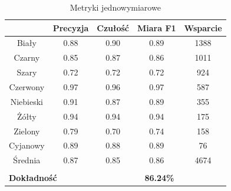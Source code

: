 \begin{table}[h!]
\begin{center}
\begin{tabular}{ccccc}
\cline{2-5}
\multicolumn{1}{c|}{}           & \multicolumn{1}{c|}{Precyzja} & \multicolumn{1}{c|}{Czułość} & \multicolumn{1}{c|}{Miara F1} & \multicolumn{1}{c|}{Wsparcie} \\ \hline
\multicolumn{1}{|c|}{Biały}     & \multicolumn{1}{c|}{0.88}     & \multicolumn{1}{c|}{0.90}    & \multicolumn{1}{c|}{0.89}     & \multicolumn{1}{c|}{1388}     \\ \hline
\multicolumn{1}{|c|}{Czarny}    & \multicolumn{1}{c|}{0.85}     & \multicolumn{1}{c|}{0.87}    & \multicolumn{1}{c|}{0.86}     & \multicolumn{1}{c|}{1011}     \\ \hline
\multicolumn{1}{|c|}{Szary}     & \multicolumn{1}{c|}{0.72}     & \multicolumn{1}{c|}{0.72}    & \multicolumn{1}{c|}{0.72}     & \multicolumn{1}{c|}{924}      \\ \hline
\multicolumn{1}{|c|}{Czerwony}  & \multicolumn{1}{c|}{0.97}     & \multicolumn{1}{c|}{0.96}    & \multicolumn{1}{c|}{0.97}     & \multicolumn{1}{c|}{587}      \\ \hline
\multicolumn{1}{|c|}{Niebieski} & \multicolumn{1}{c|}{0.91}     & \multicolumn{1}{c|}{0.87}    & \multicolumn{1}{c|}{0.89}     & \multicolumn{1}{c|}{355}      \\ \hline
\multicolumn{1}{|c|}{Żółty}     & \multicolumn{1}{c|}{0.94}     & \multicolumn{1}{c|}{0.94}    & \multicolumn{1}{c|}{0.94}     & \multicolumn{1}{c|}{175}      \\ \hline
\multicolumn{1}{|c|}{Zielony}   & \multicolumn{1}{c|}{0.79}     & \multicolumn{1}{c|}{0.70}    & \multicolumn{1}{c|}{0.74}     & \multicolumn{1}{c|}{158}      \\ \hline
\multicolumn{1}{|c|}{Cyjanowy}  & \multicolumn{1}{c|}{0.89}     & \multicolumn{1}{c|}{0.88}    & \multicolumn{1}{c|}{0.89}     & \multicolumn{1}{c|}{76}       \\ \hline
\multicolumn{1}{|c|}{Średnia}   & \multicolumn{1}{c|}{0.87}     & \multicolumn{1}{c|}{0.85}    & \multicolumn{1}{c|}{0.86}     & \multicolumn{1}{c|}{4674}     \\ \hline
\multicolumn{1}{l}{}            & \multicolumn{1}{l}{}          & \multicolumn{1}{l}{}         & \multicolumn{1}{l}{}          & \multicolumn{1}{l}{}          \\ \hline
\multicolumn{2}{|l|}{\textbf{Dokładność}}                       & \multicolumn{3}{c|}{\textbf{86.24\%}}                                                        \\ \hline
\end{tabular}
\caption{Metryki jednowymiarowe}
\label{tab:metrics}
\end{center}
\end{table}

